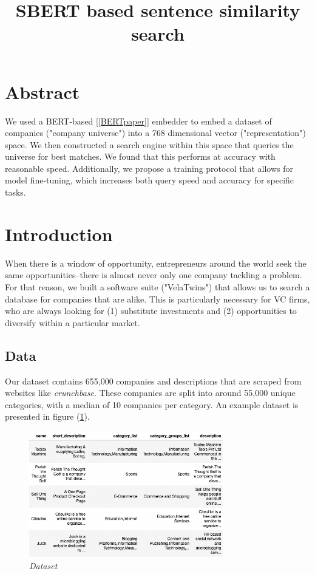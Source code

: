 \documentclass[a4paper]{article}
\title{SBERT based sentence similarity search}
\begin{document}
\maketitle

\section*{Abstract}
We used a BERT-based [\ref{BERTpaper}] embedder to embed a dataset of companies ("company
universe") into a 768 dimensional vector ("representation") space. We then
constructed a search engine within this space that queries the universe for best
matches. We found that this performs at accuracy with reasonable speed.
Additionally, we propose a training protocol that allows for model fine-tuning,
which increases both query speed and accuracy for specific tasks.

\tableofcontents

\section{Introduction}
When there is a window of opportunity, entrepreneurs around the world
seek the same opportunities--there is almost never only one
company tackling a problem. For that reason, we built a software suite
("VelaTwins") that allows us to search a database for companies that are alike.
This is particularly necessary for VC firms, who are always looking for (1)
substitute investments and (2) opportunities to diversify within a particular market.

\subsection{Data}
Our dataset contains 655,000 companies and descriptions that are scraped from
websites like \emph{crunchbase}. These companies are split into around 55,000
unique categories, with a median of 10 companies per category. An example
dataset is presented in figure (\ref{datahead}).

\begin{figure}[!h]
    \centerline{\includegraphics[width=85mm]{datahead.png}}\caption{{\it Dataset}}
    \label{datahead}
\end{figure}
\end{document}
